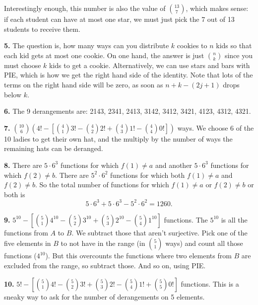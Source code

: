 \documentclass[10pt,]{book}
\theoremstyle{plain}
\theoremstyle{definition}
\theoremstyle{definition}
\theoremstyle{definition}
\numberwithin{equation}{section}
\begin{document}
            Interestingly enough, this number is also the value of \({13 \choose 7}\), which makes sense: if each student can have at most one star, we must just pick the 7 out of 13 students to receive them.
\par\smallskip
\noindent\textbf{5.}\quad{}
            The question is, how many ways can you distribute \(k\) cookies to \(n\) kids so that each kid gets at most one cookie. On one hand, the answer is just \({n \choose k}\) since you must choose \(k\) kids to get a cookie. Alternatively, we can use stars and bars with PIE, which is how we get the right hand side of the identity. Note that lots of the terms on the right hand side will be zero, as soon as \(n+k-(2j+1)\) drops below \(k\).
\par\smallskip
\noindent\textbf{6.}\quad{}
            The 9 derangements are: 2143, 2341, 2413, 3142, 3412, 3421, 4123, 4312, 4321.
\par\smallskip
\noindent\textbf{7.}\quad{}
            \({10 \choose 6}\left(4! - \left[{4 \choose 1} 3! - {4 \choose 2}2! + {4 \choose 3}1! - {4 \choose 4}0!\right]\right)\) ways. We choose 6 of the 10 ladies to get their own hat, and the multiply by the number of ways the remaining hats can be deranged.
\par\smallskip
\noindent\textbf{8.}\quad{}
      There are \(5 \cdot 6^3\) functions for which \(f(1) \ne a\) and another \(5 \cdot 6^3\) functions for which \(f(2) \ne b\).  There are \(5^2 \cdot 6^2\) functions for which both \(f(1) \ne a\) and \(f(2) \ne b\).  So the total number of functions for which \(f(1) \ne a\) or \(f(2) \ne b\) or both is
      \begin{equation*}
        5 \cdot 6^3 + 5 \cdot 6^3 - 5^2 \cdot 6^2 = 1260.
      \end{equation*}
\par\smallskip
\noindent\textbf{9.}\quad{}
      \(5^{10} - \left[{5 \choose 1}4^{10} - {5 \choose 2}3^{10} + {5 \choose 3}2^{10} - {5 \choose 4}1^{10}\right]\) functions.  The \(5^{10}\) is all the functions from \(A\) to \(B\).  We subtract those that aren't surjective.  Pick one of the five elements in \(B\) to not have in the range (in \({5 \choose 1}\) ways) and count all those functions (\(4^{10}\)).  But this overcounts the functions where two elements from \(B\) are excluded from the range, so subtract those.  And so on, using PIE.
\par\smallskip
\noindent\textbf{10.}\quad{}
      \(5! - \left[{5 \choose 1}4! - {5 \choose 2}3! + {5 \choose 3}2! - {5 \choose 4}1! + {5 \choose 5}0!\right]\) functions. This is a sneaky way to ask for the number of derangements on 5 elements.
\par\smallskip
\end{document}
